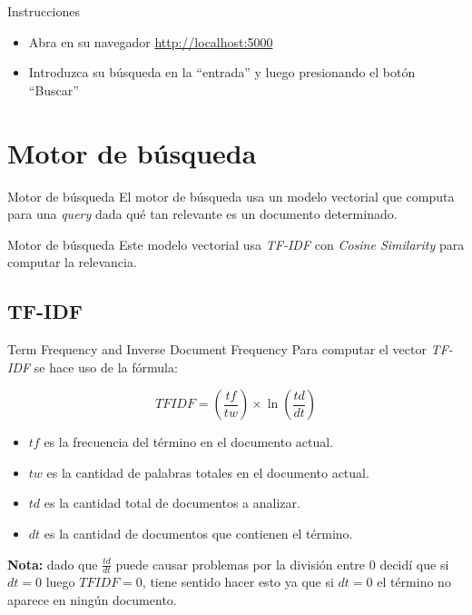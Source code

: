 \documentclass{beamer}
\begin{document}
\begin{frame}{Instrucciones}
  \begin{itemize}
    \item Abra en su navegador \href{http://localhost:5000}{http://localhost:5000}
    \item Introduzca su búsqueda en la ``entrada'' y luego presionando el botón ``Buscar''
  \end{itemize}
\end{frame}

\section*{Motor de búsqueda}

\begin{frame}{Motor de búsqueda}
  El motor de búsqueda usa un modelo vectorial que computa para una {\it query}
  dada qué tan relevante es un documento determinado.
\end{frame}

\begin{frame}{Motor de búsqueda}
  Este modelo vectorial usa
    {\it TF-IDF} con {\it Cosine
      Similarity} para computar la relevancia.
\end{frame}

\subsection*{TF-IDF}

\begin{frame}{Term Frequency and Inverse Document Frequency}
  Para computar el vector {\it TF-IDF}
  se hace uso de la fórmula:

  \begin{equation}
    TFIDF = (\frac{tf}{tw}) \times \ln(\frac{td}{dt}) \nonumber
  \end{equation}

  \begin{itemize}
    \item $tf$ es la frecuencia del término en el documento actual.
    \item $tw$ es la cantidad de palabras totales en el documento actual.
    \item $td$ es la cantidad total de documentos a analizar.
    \item $dt$ es la cantidad de documentos que contienen el término.
  \end{itemize}

  \pause

  {\bf \color{red} Nota:} dado que $\frac{td}{dt}$ puede causar problemas por la
  división entre $0$ decidí que si $dt = 0$ luego $TFIDF = 0$, tiene sentido hacer esto ya
  que si $dt = 0$ el término no aparece en ningún documento.
\end{frame}
\end{document}
